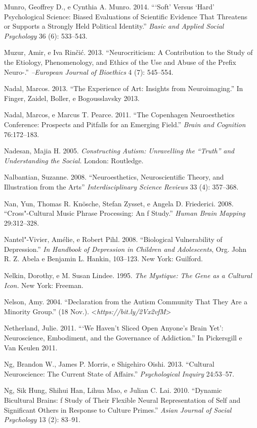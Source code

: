 {\begin{Parskip}
Munro, Geoffrey D., e Cynthia A. Munro. 2014. ```Soft' Versus `Hard'
Psychological Science: Biased Evaluations of Scientific Evidence That
Threatens or Supports a Strongly Held Political Identity.'' \emph{Basic
and Applied Social Psychology} 36 (6): 533--543.

Muzur, Amir, e Iva Rinčić. 2013. ``Neurocriticism: A Contribution to the
Study of the Etiology, Phenomenology, and Ethics of the Use and Abuse of
the Prefix Neuro-.'' \emph{--European Journal of Bioethics} 4 (7):
545--554.

Nadal, Marcos. 2013. ``The Experience of Art: Insights from
Neuroimaging.'' In Finger, Zaidel, Boller, e Bogousslavsky 2013.

Nadal, Marcos, e Marcus T. Pearce. 2011. ``The Copenhagen Neuroesthetics
Conference: Prospects and Pitfalls for an Emerging Field.'' \emph{Brain
and Cognition} 76:172--183.

Nadesan, Majia H. 2005. \emph{Constructing Autism: Unravelling the
``Truth'' and Understanding the Social.} London: Routledge.

Nalbantian, Suzanne. 2008. ``Neuroesthetics, Neuroscientific Theory, and
Illustration from the Arts'' \emph{Interdisciplinary Science Reviews} 33
(4): 357--368.

Nan, Yun, Thomas R. Knösche, Stefan Zysset, e Angela D. Friederici.
2008. ``Cross"-Cultural Music Phrase Processing: An f Study.''
\emph{Human Brain Mapping} 29:312--328.

Nantel"-Vivier, Amélie, e Robert Pihl. 2008. ``Biological Vulnerability
of Depression.'' \emph{In Handbook of Depression in Children and
Adolescents}, Org. John R. Z. Abela e Benjamin L. Hankin, 103--123. New
York: Guilford.

Nelkin, Dorothy, e M. Susan Lindee. 1995. \emph{The  Mystique: The
Gene as a Cultural Icon.} New York: Freeman.

Nelson, Amy. 2004. ``Declaration from the Autism Community That They Are
a Minority Group.'' (18 Nov.).
\textless{}\emph{https://bit.ly/2Vx2vfM}\textgreater{}

Netherland, Julie. 2011. ```We Haven't Sliced Open Anyone's Brain Yet':
Neuroscience, Embodiment, and the Governance of Addiction.'' In
Pickersgill e Van Keulen 2011.

Ng, Brandon W., James P. Morris, e Shigehiro Oishi. 2013. ``Cultural
Neuroscience: The Current State of Affairs.'' \emph{Psychological
Inquiry} 24:53--57.

Ng, Sik Hung, Shihui Han, Lihua Mao, e Julian C. Lai. 2010. ``Dynamic
Bicultural Brains: f Study of Their Flexible Neural Representation of
Self and Significant Others in Response to Culture Primes.'' \emph{Asian
Journal of Social Psychology} 13 (2): 83--91.


\end{Parskip}}

